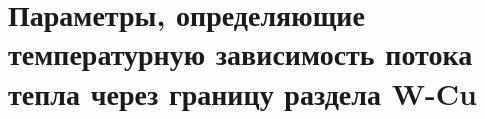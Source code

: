 \begin{comment}
            Теплота растворения,~\si{\electronvolt}                                                     & $Q_\mathrm{s}$         & \num{1.580}     \\
            Теплота хемосорбции,~\si{\electronvolt}                                                     & $|Q_\mathrm{c}|$       & \num{0.500}     \\
            Энергия активации растворения,~\si{\electronvolt}                                             & $E_\mathrm{s}$         & \num{1.960}     \\
            \bottomrule
        \end{tabularx}
    \end{threeparttable}
\end{table}
\end{comment}

\chapter{Параметры, определяющие температурную зависимость потока тепла через границу раздела W-Cu}\label{app:D}

